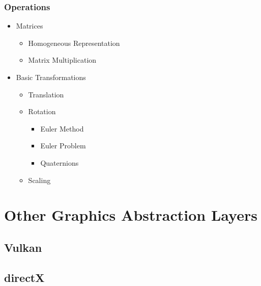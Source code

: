             \subsubsection*{Operations}
              \begin{itemize}
                \item Matrices
                \begin{itemize}
                  \item Homogeneous Representation
                  \item Matrix      Multiplication
                \end{itemize}

                \item Basic Transformations
                \begin{itemize}
                    \item Translation
                    \item Rotation
                    \begin{itemize}
                        \item Euler Method
                        \item Euler Problem
                        \item Quaternions
                    \end{itemize}
                    \item Scaling
                \end{itemize}
                \end{itemize}


    \section*{Other Graphics Abstraction Layers}
        \subsection*{Vulkan}
        \subsection*{directX}



